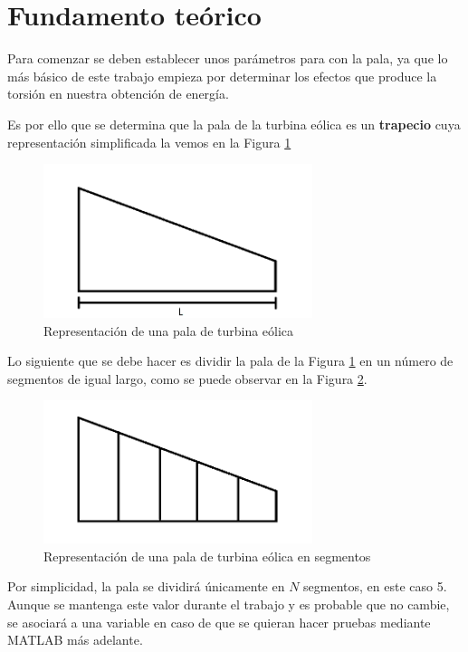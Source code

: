 \section{Fundamento teórico}

Para comenzar se deben establecer unos parámetros para con la pala, ya que lo más básico de este trabajo empieza por determinar los efectos que produce la torsión en nuestra obtención de energía.

Es por ello que se determina que la pala de la turbina eólica es un \textbf{trapecio} cuya representación simplificada la vemos en la Figura \ref{fig:pala_simp}

\begin{figure}[H]
    \centering
    \includegraphics[width=0.7\textwidth]{images/pala turbina paint.png}
    \caption{Representación de una pala de turbina eólica}
    \label{fig:pala_simp}
\end{figure}


Lo siguiente que se debe hacer es dividir la pala de la Figura \ref{fig:pala_simp} en un número de segmentos de igual largo, como se puede observar en la Figura \ref{fig:pala_dividida}.
    \textbf{}
    \begin{figure}[H]
    \centering
    \includegraphics[width=0.7\textwidth]{images/pala dividida.png}
    \caption{Representación de una pala de turbina eólica en segmentos}
    \label{fig:pala_dividida}
\end{figure}

Por simplicidad, la pala se dividirá únicamente en $N$ segmentos, en este caso 5. Aunque se mantenga este valor durante el trabajo y es probable que no cambie, se asociará a una variable en caso de que se quieran hacer pruebas mediante MATLAB más adelante. \\\\
    

